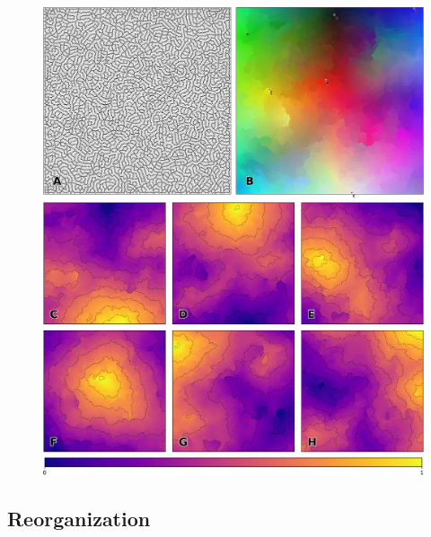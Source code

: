 \begin{figure}
  \includegraphics[width=\columnwidth]{figures/vsom-colors-1.pdf}

  \vspace{2mm}
  
  \includegraphics[width=\columnwidth]{figures/vsom-colors-2.pdf}

  \vspace{2mm}

  \includegraphics[width=\columnwidth]{figures/colormap.pdf}

  \caption{}
  \label{fig:three-dim}
\end{figure}



\subsection{Reorganization}

